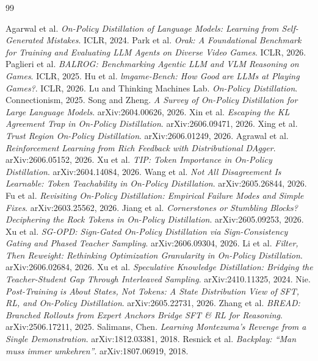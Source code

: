\documentclass[11pt]{article}
\begin{document}
\begin{thebibliography}{99}\small\raggedright
\setlength{\itemsep}{0.15em}
 Agarwal et al. \emph{On-Policy Distillation of Language Models: Learning from Self-Generated Mistakes}. ICLR, 2024.
 Park et al. \emph{Orak: A Foundational Benchmark for Training and Evaluating LLM Agents on Diverse Video Games}. ICLR, 2026.
 Paglieri et al. \emph{BALROG: Benchmarking Agentic LLM and VLM Reasoning on Games}. ICLR, 2025.
 Hu et al. \emph{lmgame-Bench: How Good are LLMs at Playing Games?}. ICLR, 2026.
 Lu and Thinking Machines Lab. \emph{On-Policy Distillation}. Connectionism, 2025.
 Song and Zheng. \emph{A Survey of On-Policy Distillation for Large Language Models}. arXiv:2604.00626, 2026.
 Xin et al. \emph{Escaping the KL Agreement Trap in On-Policy Distillation}. arXiv:2606.09471, 2026.
 Xing et al. \emph{Trust Region On-Policy Distillation}. arXiv:2606.01249, 2026.
 Agrawal et al. \emph{Reinforcement Learning from Rich Feedback with Distributional DAgger}. arXiv:2606.05152, 2026.
 Xu et al. \emph{TIP: Token Importance in On-Policy Distillation}. arXiv:2604.14084, 2026.
 Wang et al. \emph{Not All Disagreement Is Learnable: Token Teachability in On-Policy Distillation}. arXiv:2605.26844, 2026.
 Fu et al. \emph{Revisiting On-Policy Distillation: Empirical Failure Modes and Simple Fixes}. arXiv:2603.25562, 2026.
 Jiang et al. \emph{Cornerstones or Stumbling Blocks? Deciphering the Rock Tokens in On-Policy Distillation}. arXiv:2605.09253, 2026.
 Xu et al. \emph{SG-OPD: Sign-Gated On-Policy Distillation via Sign-Consistency Gating and Phased Teacher Sampling}. arXiv:2606.09304, 2026.
 Li et al. \emph{Filter, Then Reweight: Rethinking Optimization Granularity in On-Policy Distillation}. arXiv:2606.02684, 2026.
 Xu et al. \emph{Speculative Knowledge Distillation: Bridging the Teacher-Student Gap Through Interleaved Sampling}. arXiv:2410.11325, 2024.
 Nie. \emph{Post-Training is About States, Not Tokens: A State Distribution View of SFT, RL, and On-Policy Distillation}. arXiv:2605.22731, 2026.
 Zhang et al. \emph{BREAD: Branched Rollouts from Expert Anchors Bridge SFT \& RL for Reasoning}. arXiv:2506.17211, 2025.
 Salimans, Chen. \emph{Learning Montezuma's Revenge from a Single Demonstration}. arXiv:1812.03381, 2018.
 Resnick et al. \emph{Backplay: ``Man muss immer umkehren''}. arXiv:1807.06919, 2018.

\end{thebibliography}
\end{document}
